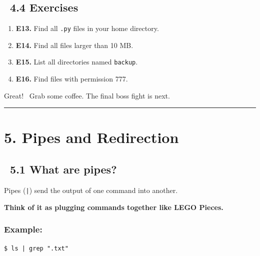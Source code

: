 \documentclass[12pt]{article}
\newcommand{\exerciseicon}{\faTasks}
\newcommand{\coffeeicon}{\faCoffee}
\newcommand{\pipeicon}{\faProjectDiagram}
\begin{document}
\subsection*{\exerciseicon\ 4.4 Exercises}

\begin{enumerate}
    \item \textbf{E13.} Find all \texttt{.py} files in your home directory.
    
    \item \textbf{E14.} Find all files larger than 10 MB.
    
    \item \textbf{E15.} List all directories named \texttt{backup}.
    
    \item \textbf{E16.} Find files with permission 777.
\end{enumerate}

\begin{infobox}
Great! \coffeeicon\ Grab some coffee. The final boss fight is next.
\end{infobox}

\vspace{1em}
\begin{center}
\color{teamred}\rule{0.8\textwidth}{1pt}
\end{center}

\section*{5. Pipes and Redirection}

\subsection*{\pipeicon\ 5.1 What are pipes?}

Pipes (\texttt{|}) send the output of one command into another.

\begin{infobox}
\textbf{Think of it as plugging commands together like LEGO Pieces.}
\end{infobox}

\subsubsection*{Example:}

\begin{highlightbox}
\texttt{\$ ls | grep ".txt"}
\end{highlightbox}
\end{document}
